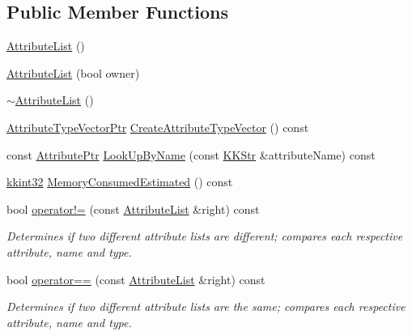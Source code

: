 \subsection*{Public Member Functions}
\begin{DoxyCompactItemize}
\item 
\hyperlink{class_k_k_m_l_l_1_1_attribute_list_a192435ac438fe36a41a978bced27a7dc}{Attribute\+List} ()
\item 
\hyperlink{class_k_k_m_l_l_1_1_attribute_list_ac96d0b067fa7c4ae0d1d9d642cde7a30}{Attribute\+List} (bool owner)
\item 
\hyperlink{class_k_k_m_l_l_1_1_attribute_list_ae40c5ea70017508fc6101cd308f64f73}{$\sim$\+Attribute\+List} ()
\item 
\hyperlink{namespace_k_k_m_l_l_aaac261e37ef0685bf17b486fd0498aa9}{Attribute\+Type\+Vector\+Ptr} \hyperlink{class_k_k_m_l_l_1_1_attribute_list_aacfce8fd512499a96e91f3f878876a30}{Create\+Attribute\+Type\+Vector} () const 
\item 
const \hyperlink{namespace_k_k_m_l_l_a7bf3ea66cacd9dddc58369800cbc93b6}{Attribute\+Ptr} \hyperlink{class_k_k_m_l_l_1_1_attribute_list_a3018b07b5756d0d73efb9fdd599cc3d2}{Look\+Up\+By\+Name} (const \hyperlink{class_k_k_b_1_1_k_k_str}{K\+K\+Str} \&attribute\+Name) const 
\item 
\hyperlink{namespace_k_k_b_a8fa4952cc84fda1de4bec1fbdd8d5b1b}{kkint32} \hyperlink{class_k_k_m_l_l_1_1_attribute_list_a740adbac7028e49162bafb797b29894a}{Memory\+Consumed\+Estimated} () const 
\item 
bool \hyperlink{class_k_k_m_l_l_1_1_attribute_list_a2f9bb74d42da71aa60d11ffd64e051ad}{operator!=} (const \hyperlink{class_k_k_m_l_l_1_1_attribute_list}{Attribute\+List} \&right) const 
\begin{DoxyCompactList}\small\item\em Determines if two different attribute lists are different; compares each respective attribute, name and type. \end{DoxyCompactList}\item 
bool \hyperlink{class_k_k_m_l_l_1_1_attribute_list_abd4c2ee5f677c2678bb93b1b6b722212}{operator==} (const \hyperlink{class_k_k_m_l_l_1_1_attribute_list}{Attribute\+List} \&right) const 
\begin{DoxyCompactList}\small\item\em Determines if two different attribute lists are the same; compares each respective attribute, name and type. \end{DoxyCompactList}\item 

\end{DoxyCompactItemize}
